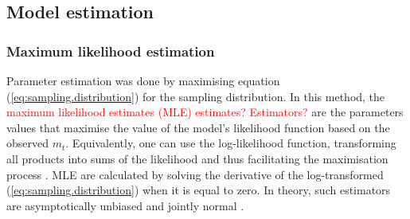 
\subsection{Model estimation}

\subsubsection{Maximum likelihood estimation}

Parameter estimation was done by maximising equation (\ref{eq:sampling.distribution}) for the sampling distribution.
In this method, the \textcolor{red}{maximum likelihood estimates (MLE) estimates? Estimators?} are the parameters values that maximise the value of the model's likelihood function based on the observed $m_t$.
Equivalently, one can use the log-likelihood function,
%
%
 transforming all products into sums of the likelihood and thus facilitating the maximisation process \cite{williams1994maximum}.
MLE are calculated by solving the derivative of the log-transformed (\ref{eq:sampling.distribution}) when it is equal to zero.
In theory, such estimators are asymptotically unbiased and jointly normal \cite{casella2002statistical}.


